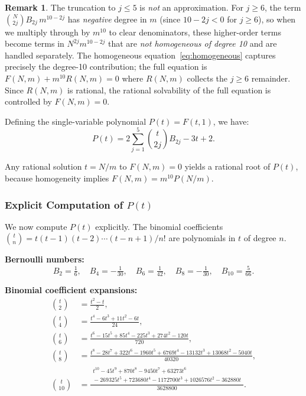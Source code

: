 \documentclass[12pt,a4paper]{article}
\theoremstyle{plain}
\theoremstyle{definition}
\newtheorem{remark}[theorem]{Remark}
\begin{document}
\begin{remark}
  The truncation to $j \le 5$ is \emph{not} an approximation.  For
  $j \ge 6$, the term $\binom{N}{2j} B_{2j} \, m^{10-2j}$ has
  \emph{negative} degree in $m$ (since $10-2j < 0$ for $j \ge 6$),
  so when we multiply through by $m^{10}$ to clear denominators, these
  higher-order terms become terms in $N^{2j} m^{10-2j}$ that are
  \emph{not homogeneous of degree 10} and are handled separately.
  The homogeneous equation~\eqref{eq:homogeneous} captures precisely
  the degree-10 contribution; the full equation is
  $F(N,m) + m^{10} R(N,m) = 0$ where $R(N,m)$ collects the
  $j \ge 6$ remainder.  Since $R(N,m)$ is rational, the rational
  solvability of the full equation is controlled by
  $F(N,m) = 0$.
\end{remark}

Defining the single-variable polynomial $P(t) = F(t, 1)$, we have:
\begin{equation}\label{eq:Pt-def}
  P(t) = 2\sum_{j=1}^{5} \binom{t}{2j} B_{2j} - 3t + 2.
\end{equation}

Any rational solution $t = N/m$ to $F(N,m) = 0$ yields a rational
root of $P(t)$, because homogeneity implies
$F(N,m) = m^{10} P(N/m)$.

\subsubsection{Explicit Computation of $P(t)$}
\label{sec:explicit-computation}

We now compute $P(t)$ explicitly.  The binomial coefficients
$\binom{t}{n} = t(t-1)(t-2)\cdots(t-n+1)/n!$ are polynomials
in $t$ of degree $n$.

\textbf{Bernoulli numbers:}
\[
  B_2 = \tfrac{1}{6},\quad
  B_4 = -\tfrac{1}{30},\quad
  B_6 = \tfrac{1}{42},\quad
  B_8 = -\tfrac{1}{30},\quad
  B_{10} = \tfrac{5}{66}.
\]

\textbf{Binomial coefficient expansions:}
\begin{align*}
  \binom{t}{2} &= \frac{t^2 - t}{2}, \\
  \binom{t}{4} &= \frac{t^4 - 6t^3 + 11t^2 - 6t}{24}, \\
  \binom{t}{6} &= \frac{t^6 - 15t^5 + 85t^4 - 225t^3 + 274t^2 - 120t}{720}, \\
  \binom{t}{8} &= \frac{t^8 - 28t^7 + 322t^6 - 1960t^5 + 6769t^4
                   - 13132t^3 + 13068t^2 - 5040t}{40320}, \\
  \binom{t}{10} &= \frac{\begin{gathered}
                   t^{10} - 45t^9 + 870t^8 - 9450t^7 + 63273t^6 \\
                   {}- 269325t^5 + 723680t^4 - 1172700t^3 + 1026576t^2 - 362880t
                 \end{gathered}}{3628800}.
\end{align*}
\end{document}
